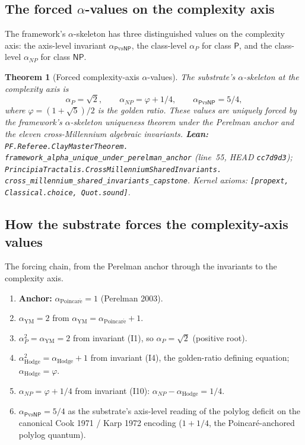 \documentclass[11pt,a4paper]{article}
\theoremstyle{plain}
\newtheorem{theorem}{Theorem}[section]
\theoremstyle{definition}
\begin{document}
\subsection{The forced $\alpha$-values on the complexity axis}
\label{sec:forced-values}

The framework's $\alpha$-skeleton has three distinguished values on
the complexity axis: the axis-level invariant
$\alpha_{\mathsf{P}\mathrm{vs}\mathsf{NP}}$, the class-level
$\alpha_{P}$ for class $\mathsf{P}$, and the class-level $\alpha_{NP}$
for class $\mathsf{NP}$.

\begin{theorem}[Forced complexity-axis $\alpha$-values]
\label{thm:forced-complexity}
The substrate's $\alpha$-skeleton at the complexity axis is
\[
\alpha_{P} = \sqrt{2}, \qquad
\alpha_{NP} = \varphi + 1/4, \qquad
\alpha_{\mathsf{P}\mathrm{vs}\mathsf{NP}} = 5/4,
\]
where $\varphi = (1 + \sqrt{5})/2$ is the golden ratio. These values
are uniquely forced by the framework's $\alpha$-skeleton uniqueness
theorem under the Perelman anchor and the eleven cross-Millennium
algebraic invariants.
\textbf{Lean:}
\texttt{PF.Referee.ClayMasterTheorem.\\
framework\_alpha\_unique\_under\_perelman\_anchor}
(line~55, HEAD \texttt{cc7d9d3});
\texttt{PrincipiaTractalis.CrossMillenniumSharedInvariants.\\
cross\_millennium\_shared\_invariants\_capstone}.
Kernel axioms: \texttt{[propext, Classical.choice, Quot.sound]}.
\end{theorem}

\subsection{How the substrate forces the complexity-axis values}
\label{sec:how-forced}

The forcing chain, from the Perelman anchor through the invariants to
the complexity axis.

\begin{enumerate}[leftmargin=*,nosep]
\item \textbf{Anchor:} $\alpha_{\mathrm{Poincar\acute e}} = 1$
  (Perelman 2003).
\item \textbf{$\alpha_{\mathrm{YM}} = 2$} from
  $\alpha_{\mathrm{YM}} = \alpha_{\mathrm{Poincar\acute e}} + 1$.
\item \textbf{$\alpha_{P}^{2} = \alpha_{\mathrm{YM}} = 2$} from
  invariant (I1), so $\alpha_{P} = \sqrt{2}$ (positive root).
\item \textbf{$\alpha_{\mathrm{Hodge}}^{2} = \alpha_{\mathrm{Hodge}} +
  1$} from invariant (I4), the golden-ratio defining
  equation; $\alpha_{\mathrm{Hodge}} = \varphi$.
\item \textbf{$\alpha_{NP} = \varphi + 1/4$} from invariant
  (I10): $\alpha_{NP} - \alpha_{\mathrm{Hodge}} = 1/4$.
\item \textbf{$\alpha_{\mathsf{P}\mathrm{vs}\mathsf{NP}} = 5/4$} as
  the substrate's axis-level reading of the polylog deficit on the
  canonical Cook 1971 / Karp 1972 encoding ($1 + 1/4$, the
  Poincar\'e-anchored polylog quantum).
\end{enumerate}
\end{document}
